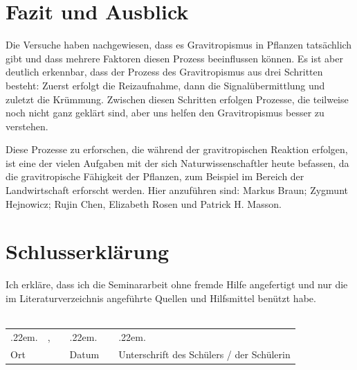 \documentclass[
11pt, 
ngerman,
listof=totocnumbered,
oneside,
bibliography=totocnumbered,
abstracton
]{scrreprt}
\makeatletter
\newcommand \Dotfill {\leavevmode \cleaders \hb@xt@ .22em{\hss .\hss }\hfill \kern \z@}
\makeatother
\begin{document}
\chapter{Fazit und Ausblick}

Die Versuche haben nachgewiesen, dass es Gravitropismus in Pflanzen tatsächlich gibt und dass mehrere Faktoren diesen Prozess beeinflussen können. Es ist aber deutlich erkennbar, dass der Prozess des Gravitropismus aus drei Schritten besteht: Zuerst erfolgt die Reizaufnahme, dann die Signalübermittlung und zuletzt die Krümmung. Zwischen diesen Schritten erfolgen Prozesse, die teilweise noch nicht ganz geklärt sind, aber uns helfen den Gravitropismus besser zu verstehen. 

Diese Prozesse zu erforschen, die während der gravitropischen Reaktion erfolgen, ist eine der vielen Aufgaben mit der sich Naturwissenschaftler  heute befassen, da die gravitropische Fähigkeit der Pflanzen, zum Beispiel im Bereich der Landwirtschaft erforscht werden\parencite[343]{Chen1999}.
Hier anzuführen sind: Markus Braun; Zygmunt Hejnowicz; Rujin Chen, Elizabeth Rosen und Patrick H. Masson.


\printbibliography

\listoffigures

\chapter {Schlusserklärung}

Ich erkläre, dass ich die Seminararbeit ohne fremde Hilfe angefertigt und nur die im Literaturverzeichnis angeführte Quellen und Hilfsmittel benützt habe.
\\
\\

\setlength\tabcolsep{0pt}\noindent\begin{tabular}{p{} p{} p{} p{} p{} p{}}
	\Dotfill & \hfill, & & \Dotfill &  & \Dotfill \\ 
	Ort & & & Datum &  & Unterschrift des Schülers / der Schülerin \\
\end{tabular}
\end{document}
